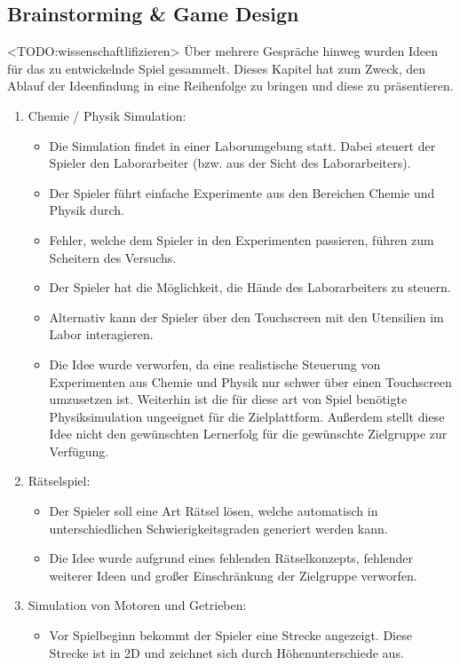 \subsection{Brainstorming \& Game Design}\label{ssec:idee}
	<TODO:wissenschaftlifizieren>
	Über mehrere Gespräche hinweg wurden Ideen für das zu entwickelnde Spiel gesammelt. Dieses Kapitel hat zum Zweck, den Ablauf der Ideenfindung in eine Reihenfolge zu bringen und diese zu präsentieren.
	\begin{enumerate}
		\item{Chemie / Physik Simulation:}
		\begin{itemize}
			\item{Die Simulation findet in einer Laborumgebung statt. Dabei steuert der Spieler den Laborarbeiter (bzw. aus der Sicht des Laborarbeiters).}
			\item{Der Spieler führt einfache Experimente aus den Bereichen Chemie und Physik durch.}
			\item{Fehler, welche dem Spieler in den Experimenten passieren, führen zum Scheitern des Versuchs.}
			\item{Der Spieler hat die Möglichkeit, die Hände des Laborarbeiters zu steuern.}
			\item{Alternativ kann der Spieler über den Touchscreen mit den Utensilien im Labor interagieren.}
			\item{Die Idee wurde verworfen, da eine realistische Steuerung von Experimenten aus Chemie und Physik nur schwer über einen Touchscreen umzusetzen ist. Weiterhin ist die für diese art von Spiel benötigte Physiksimulation ungeeignet für die Zielplattform. Außerdem stellt diese Idee nicht den gewünschten Lernerfolg für die gewünschte Zielgruppe zur Verfügung. }
		\end{itemize}
		\item{Rätselspiel:}
		\begin{itemize}
			\item{Der Spieler soll eine Art Rätsel lösen, welche automatisch in unterschiedlichen Schwierigkeitsgraden generiert werden kann.}
			\item{Die Idee wurde aufgrund eines fehlenden Rätselkonzepts, fehlender weiterer Ideen und großer Einschränkung der Zielgruppe verworfen.}
		\end{itemize}
		\item{Simulation von Motoren und Getrieben:}
		\begin{itemize}
			\item{Vor Spielbeginn bekommt der Spieler eine Strecke angezeigt. Diese Strecke ist in 2D und zeichnet sich durch Höhenunterschiede aus.}

\end{itemize}
\end{enumerate}
